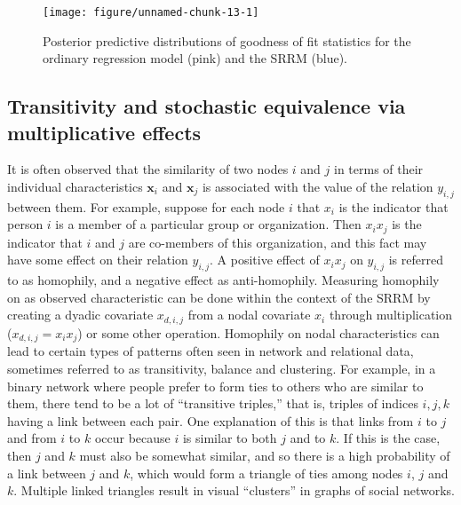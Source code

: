 \documentclass[11pt]{article}\usepackage[]{graphicx}\usepackage[]{color}
\newenvironment{knitrout}{}{} %
\newcommand{\bl}[1]{{\mathbf #1}}
\begin{document}
\begin{figure}
\begin{knitrout}\footnotesize
{}\color{fgcolor}

{\centering \texttt{[image: figure/unnamed-chunk-13-1]} 

}



\end{knitrout}
\caption{Posterior predictive distributions of goodness of fit statistics for the 
ordinary regression model (pink) and the SRRM (blue).}
\label{fig:gof_srrm}
\end{figure}




\subsection{Transitivity and stochastic equivalence via multiplicative 
effects}
It is often observed that the similarity of two nodes $i$ and $j$ in terms 
of their individual characteristics $\bl x_i$ and $\bl x_j$ 
is associated with the 
value of the relation $y_{i,j}$ between them. 
For example, suppose  for each node $i$  that $x_i$ 
is the indicator that person $i$ 
is a member of a particular  group or organization. 
Then $x_{i}x_{j}$ is the indicator that $i$ and $j$ are 
co-members of this organization, and this fact may have 
some effect on their relation $y_{i,j}$. 
A positive effect of $x_ix_j$ on $y_{i,j}$ is 
referred to as homophily, and a negative effect 
as anti-homophily. 
Measuring homophily on as observed 
characteristic can be done within the context of the SRRM 
by creating a dyadic covariate  $x_{d,i,j}$ 
from a nodal covariate $x_i$ through multiplication 
($x_{d,i,j} = x_i x_j$) or some other operation. 
Homophily on nodal characteristics can lead to certain types of 
patterns  often seen in network and relational data, 
sometimes referred to as transitivity, balance and clustering. 
For example, in a binary network where people prefer to form 
ties to others who are similar to them,  
there tend to be a lot of 
 ``transitive triples,'' that is, triples of indices $i,j,k$ having a link 
between each pair. One explanation of this is that links 
from $i$ to $j$ and from $i$ to $k$ occur because $i$ is similar to 
both $j$ and to $k$. If this is the case, then 
$j$ and $k$ must also be somewhat similar, and so there 
is a high probability of a link between $j$ and $k$, which would form
a triangle of ties among nodes $i$, $j$ and $k$. Multiple linked 
triangles result in visual ``clusters'' in graphs of social networks. 
\end{document}
